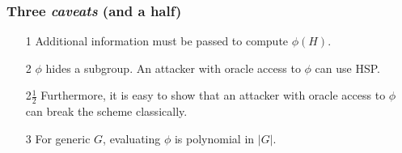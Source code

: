 \documentclass{beamer}
\begin{document}

\begin{frame}
  \frametitle{Three \textit{caveats} (and a half)}

  \begin{center}
  \end{center}  

  \begin{itemize}
  \item[1] \alert{Additional information} must be passed to compute
    \alert{$\phi(H)$}.
  \item[2] $\phi$ \alert{hides a subgroup}. An attacker with oracle
    access to $\phi$ can use HSP.
  \item[2$\frac{1}{2}$] Furthermore, it is easy to show that an
    attacker with oracle access to $\phi$ can break the scheme
    classically.
  \item[3] For generic $G$, evaluating $\phi$ is \alert{polynomial in
      $|G|$}.
  \end{itemize}
\end{frame}

\end{document}

